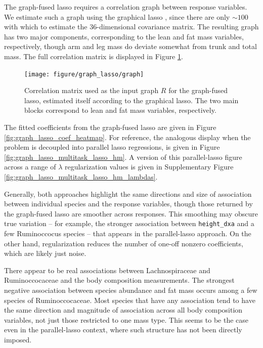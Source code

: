 \documentclass{article}
\begin{document}
The graph-fused lasso requires a correlation graph between response variables.
We estimate such a graph using the graphical lasso \citep{friedman2008sparse},
since there are only $\sim 100$ with which to estimate the 36-dimensional
covariance matrix. The resulting graph has two major components, corresponding
to the lean and fat mass variables, respectively, though arm and leg mass do
deviate somewhat from trunk and total mass. The full correlation matrix is
displayed in Figure \ref{fig:graph_lasso_graph}.

\begin{figure}
  \centering
  \texttt{[image: figure/graph\_lasso/graph]}
  \caption{Correlation matrix used as the input graph $R$ for the graph-fused
    lasso, estimated itself according to the graphical
    lasso. The two main blocks correspond to lean and fat mass variables,
    respectively. \label{fig:graph_lasso_graph} }
\end{figure}

The fitted coefficients from the graph-fused lasso are given in Figure
\ref{fig:graph_lasso_coef_heatmap}. For reference, the analogous display when
the problem is decoupled into parallel lasso regressions, is given in Figure
\ref{fig:graph_lasso_multitask_lasso_hm}. A version of this parallel-lasso
figure across a range of $\lambda$ regularization values is given in
Supplementary Figure \ref{fig:graph_lasso_multitask_lasso_hm_lambdas}.

Generally, both approaches highlight the same directions and size of association
between individual species and the response variables, though those returned by
the graph-fused lasso are smoother across responses. This smoothing may obscure
true variation -- for example, the stronger association between
\texttt{height\_dxa} and a few Ruminoccocus species -- that appears in the
parallel-lasso approach. On the other hand, regularization reduces the number of
one-off nonzero coefficients, which are likely just noise.

There appear to be real associations between Lachnospiraceae and Ruminoccocaceae
and the body composition measurements. The strongest negative association
between species abundance and fat mass occurs among a few species of
Ruminoccocaceae. Most species that have any association tend to have the same
direction and magnitude of association across all body composition variables,
not just those restricted to one mass type. This seems to be the case even in
the parallel-lasso context, where such structure has not been directly imposed.
\end{document}
